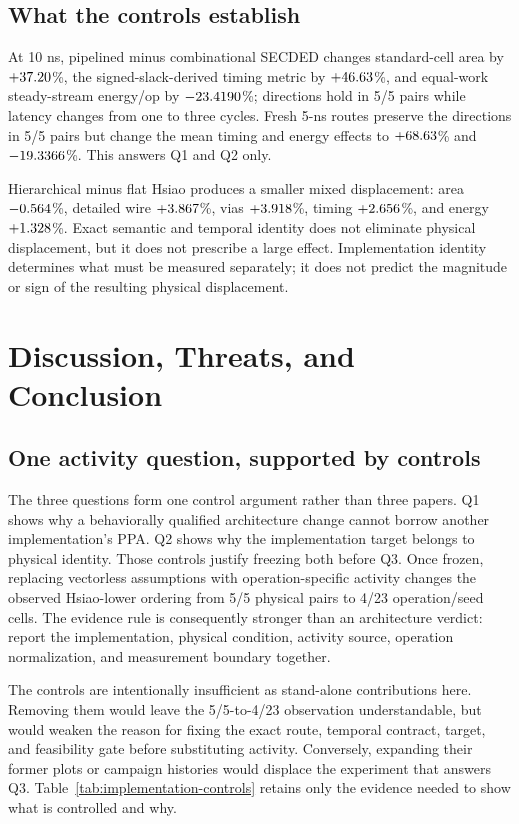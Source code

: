 \documentclass[conference,10pt]{IEEEtran}
\begin{document}
\subsection{What the controls establish}
At 10 ns, pipelined minus combinational SECDED changes standard-cell area by $+37.20$\%, the signed-slack-derived timing metric by $+46.63$\%, and equal-work steady-stream energy/op by $-23.4190$\%; directions hold in 5/5 pairs while latency changes from one to three cycles. Fresh 5-ns routes preserve the directions in 5/5 pairs but change the mean timing and energy effects to $+68.63$\% and $-19.3366$\%. This answers Q1 and Q2 only.

Hierarchical minus flat Hsiao produces a smaller mixed displacement: area $-0.564$\%, detailed wire $+3.867$\%, vias $+3.918$\%, timing $+2.656$\%, and energy $+1.328$\%. Exact semantic and temporal identity does not eliminate physical displacement, but it does not prescribe a large effect. Implementation identity determines what must be measured separately; it does not predict the magnitude or sign of the resulting physical displacement.

\section{Discussion, Threats, and Conclusion}
\subsection{One activity question, supported by controls}
The three questions form one control argument rather than three papers. Q1 shows why a behaviorally qualified architecture change cannot borrow another implementation's PPA. Q2 shows why the implementation target belongs to physical identity. Those controls justify freezing both before Q3. Once frozen, replacing vectorless assumptions with operation-specific activity changes the observed Hsiao-lower ordering from 5/5 physical pairs to 4/23 operation/seed cells. The evidence rule is consequently stronger than an architecture verdict: report the implementation, physical condition, activity source, operation normalization, and measurement boundary together.

The controls are intentionally insufficient as stand-alone contributions here. Removing them would leave the 5/5-to-4/23 observation understandable, but would weaken the reason for fixing the exact route, temporal contract, target, and feasibility gate before substituting activity. Conversely, expanding their former plots or campaign histories would displace the experiment that answers Q3. Table~\ref{tab:implementation-controls} retains only the evidence needed to show what is controlled and why.
\end{document}
